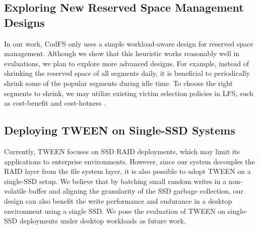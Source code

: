 \subsection{Exploring New Reserved Space Management Designs}

In our work, CodFS only uses a simple workload-aware design for reserved space
management. Although we show that this heuristic works reasonably well in
evaluations, we plan to explore more advanced designs. For example, instead of
shrinking the reserved space of all segments daily, it is beneficial to
periodically shrink some of the popular segments during idle time. To choose the
right segments to shrink, we may
utilize existing victim selection policies in LFS, such as cost-benefit
\cite{rosenblum92} and cost-hotness \cite{min12}.

\subsection{Deploying TWEEN on Single-SSD Systems}

Currently, TWEEN focuses on SSD RAID deployments, which may limit its
applications to enterprise environments.  However, since our system decouples
the RAID layer from the file system layer, it is also possible to adopt TWEEN on
a single-SSD setup. We believe that by batching small random writes in a
non-volatile buffer and aligning the granularity of the SSD garbage collection,
our design can also benefit the write performance and endurance in a desktop
environment using a single SSD.  We pose the evaluation of TWEEN on single-SSD
deployments under desktop workloads as future work.

